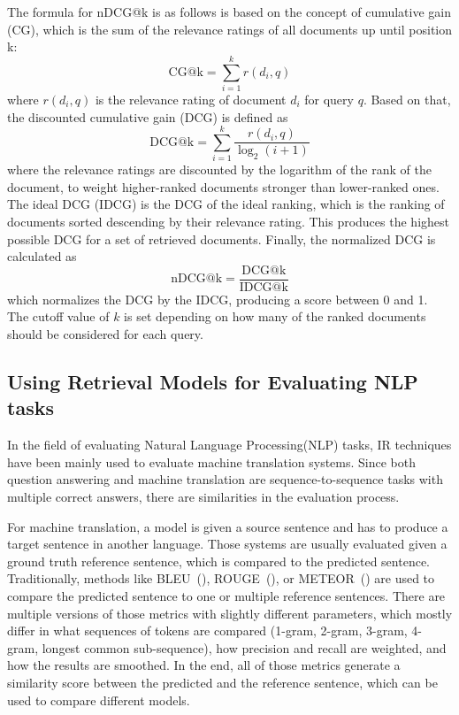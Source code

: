The formula for nDCG@k is as follows is based on the concept of cumulative gain (CG), which is the sum of the relevance ratings of all documents up until position k:
\[ \text{CG@k} = \sum_{i=1}^{k} r(d_i,q) \]
where $r(d_i,q)$ is the relevance rating of document $d_i$ for query $q$.
Based on that, the discounted cumulative gain (DCG) is defined as
\[ \text{DCG@k} = \sum_{i=1}^{k} \frac{r(d_i,q)}{\log_2(i+1)} \]
where the relevance ratings are discounted by the logarithm of the rank of the document, to weight higher-ranked documents stronger than lower-ranked ones.
The ideal DCG (IDCG) is the DCG of the ideal ranking, which is the ranking of documents sorted descending by their relevance rating.
This produces the highest possible DCG for a set of retrieved documents.
Finally, the normalized DCG is calculated as
\[ \text{nDCG@k} = \frac{\text{DCG@k}}{\text{IDCG@k}} \]
which normalizes the DCG by the IDCG, producing a score between 0 and 1.
The cutoff value of $k$ is set depending on how many of the ranked documents should be considered for each query.

\subsection{Using Retrieval Models for Evaluating NLP tasks}\label{sec:eval-mts-ir}
In the field of evaluating Natural Language Processing(NLP) tasks, IR techniques have been mainly used to evaluate machine translation systems.
Since both question answering and machine translation are sequence-to-sequence tasks with multiple correct answers, there are similarities in the evaluation process.

For machine translation, a model is given a source sentence and has to produce a target sentence in another language.
Those systems are usually evaluated given a ground truth reference sentence, which is compared to the predicted sentence.
Traditionally, methods like BLEU~(\cite{papineni:2002:Bleu}), ROUGE~(\cite{lin:2004:Rouge}), or METEOR~(\cite{banerjee:2005:METEOR}) are used to compare the predicted sentence to one or multiple reference sentences.
There are multiple versions of those metrics with slightly different parameters, which mostly differ in what sequences of tokens are compared (1-gram, 2-gram, 3-gram, 4-gram, longest common sub-sequence), how precision and recall are weighted, and how the results are smoothed.
In the end, all of those metrics generate a similarity score between the predicted and the reference sentence, which can be used to compare different models.

